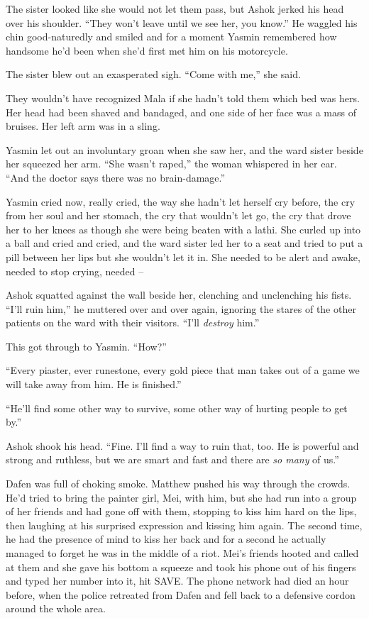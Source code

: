 The sister looked like she would not let them pass, but Ashok
jerked his head over his shoulder. ``They won't leave until we see
her, you know.'' He waggled his chin good-naturedly and smiled and
for a moment Yasmin remembered how handsome he'd been when she'd
first met him on his motorcycle.

The sister blew out an exasperated sigh. ``Come with me,'' she said.

They wouldn't have recognized Mala if she hadn't told them which
bed was hers. Her head had been shaved and bandaged, and one side
of her face was a mass of bruises. Her left arm was in a sling.

Yasmin let out an involuntary groan when she saw her, and the ward
sister beside her squeezed her arm. ``She wasn't raped,'' the woman
whispered in her ear. ``And the doctor says there was no
brain-damage.''

Yasmin cried now, really cried, the way she hadn't let herself cry
before, the cry from her soul and her stomach, the cry that
wouldn't let go, the cry that drove her to her knees as though she
were being beaten with a lathi. She curled up into a ball and cried
and cried, and the ward sister led her to a seat and tried to put a
pill between her lips but she wouldn't let it in. She needed to be
alert and awake, needed to stop crying, needed --

Ashok squatted against the wall beside her, clenching and
unclenching his fists. ``I'll ruin him,'' he muttered over and over
again, ignoring the stares of the other patients on the ward with
their visitors. ``I'll \emph{destroy} him.''

This got through to Yasmin. ``How?''

``Every piaster, ever runestone, every gold piece that man takes out
of a game we will take away from him. He is finished.''

``He'll find some other way to survive, some other way of hurting
people to get by.''

Ashok shook his head. ``Fine. I'll find a way to ruin that, too. He
is powerful and strong and ruthless, but we are smart and fast and
there are \emph{so many} of us.''

\tb

Dafen was full of choking smoke. Matthew pushed his way through the
crowds. He'd tried to bring the painter girl, Mei, with him, but
she had run into a group of her friends and had gone off with them,
stopping to kiss him hard on the lips, then laughing at his
surprised expression and kissing him again. The second time, he had
the presence of mind to kiss her back and for a second he actually
managed to forget he was in the middle of a riot. Mei's friends
hooted and called at them and she gave his bottom a squeeze and
took his phone out of his fingers and typed her number into it, hit
SAVE. The phone network had died an hour before, when the police
retreated from Dafen and fell back to a defensive cordon around the
whole area.

